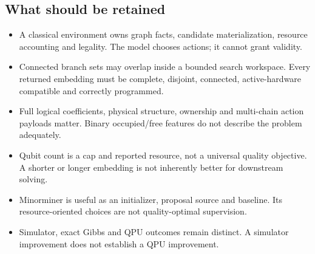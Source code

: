 \documentclass[11pt,a4paper]{article}
\theoremstyle{definition}\newtheorem{definition}[proposition]{Definition}
\begin{document}
\subsection*{What should be retained}
\begin{itemize}
\item A classical environment owns graph facts, candidate materialization, resource accounting and legality. The model chooses actions; it cannot grant validity.
\item Connected branch sets may overlap inside a bounded search workspace. Every returned embedding must be complete, disjoint, connected, active-hardware compatible and correctly programmed.
\item Full logical coefficients, physical structure, ownership and multi-chain action payloads matter. Binary occupied/free features do not describe the problem adequately.
\item Qubit count is a cap and reported resource, not a universal quality objective. A shorter or longer embedding is not inherently better for downstream solving.
\item Minorminer is useful as an initializer, proposal source and baseline. Its resource-oriented choices are not quality-optimal supervision.
\item Simulator, exact Gibbs and QPU outcomes remain distinct. A simulator improvement does not establish a QPU improvement.
\end{itemize}
\end{document}
